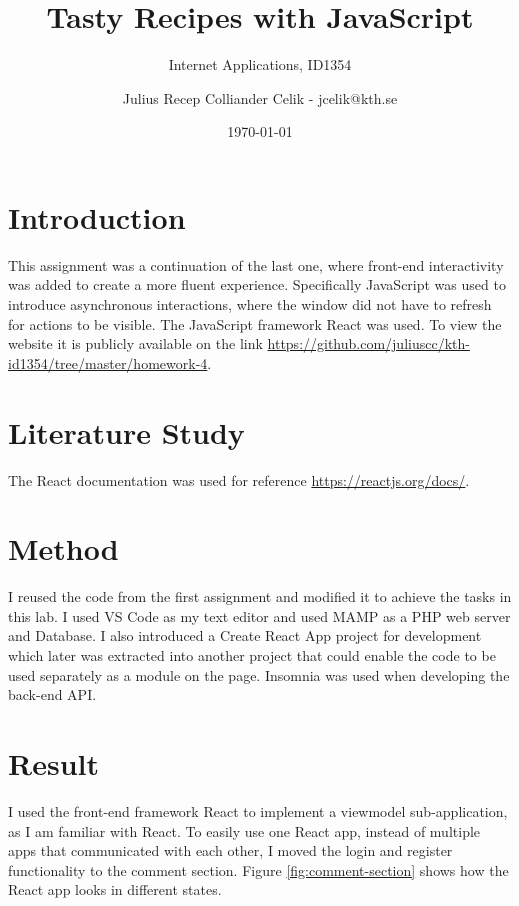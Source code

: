 \documentclass[a4paper]{scrartcl}
\title{Tasty Recipes with JavaScript}
\subtitle{Internet Applications, ID1354}
\author{Julius Recep Colliander Celik - jcelik@kth.se}
\date{\today}
\begin{document}
\maketitle

\section{Introduction}

This assignment was a continuation of the last one, where front-end interactivity was added to create a more fluent experience. Specifically JavaScript was used to introduce asynchronous interactions, where the window did not have to refresh for actions to be visible. The JavaScript framework React was used. To view the website it is publicly available on the link \href{https://github.com/juliuscc/kth-id1354/tree/master/homework-4}{https://github.com/juliuscc/kth-id1354/tree/master/homework-4}.

\section{Literature Study}

The React documentation was used for reference \href{https://reactjs.org/docs/}{https://reactjs.org/docs/}.

\section{Method}

I reused the code from the first assignment and modified it to achieve the tasks in this lab. I used VS Code as my text editor and used MAMP as a PHP web server and Database. I also introduced a Create React App project for development which later was extracted into another project that could enable the code to be used separately as a module on the page. Insomnia was used when developing the back-end API.

\section{Result}

I used the front-end framework React to implement a viewmodel sub-application, as I am familiar with React. To easily use one React app, instead of multiple apps that communicated with each other, I moved the login and register functionality to the comment section. Figure \ref{fig:comment-section} shows how the React app looks in different states.
\end{document}
